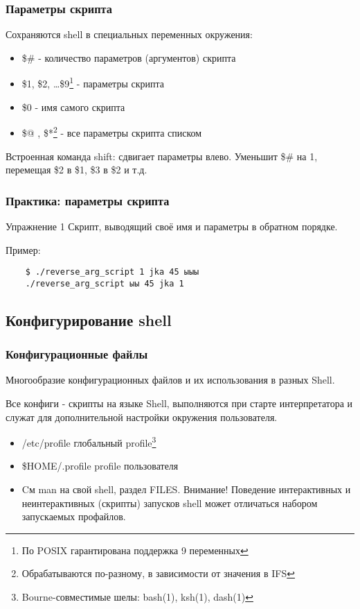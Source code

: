 \begin{frame}[fragile]
  \frametitle{Параметры скрипта}

  Сохраняются shell в специальных переменных окружения:
  \begin{itemize}
    \item \alert{\$\#} - количество параметров (аргументов) скрипта
    \item \alert{\$1, \$2, \ldots \$9}\footnote{По POSIX гарантирована поддержка 9 переменных} - параметры скрипта
      
\pause
    \item \alert{\$0} - имя самого скрипта
    \item \alert{\$@ , \$*}\footnote{Обрабатываются по-разному, в зависимости от значения в IFS} - все параметры скрипта списком 
  \end{itemize} \pause
  Встроенная команда \alert{shift}: сдвигает параметры влево. 
  Уменьшит \alert{\$\#} на 1, перемещая \alert{\$2} в \alert{\$1}, \alert{\$3} в \alert{\$2} и т.д.


\end{frame}

\begin{frame}[fragile]
  \frametitle{Практика: параметры скрипта}

  \alert{Упражнение 1} Скрипт, выводящий своё имя и параметры в обратном порядке.

  Пример:
  \begin{verbatim}
    $ ./reverse_arg_script 1 jka 45 ыыы
    ./reverse_arg_script ыы 45 jka 1
  \end{verbatim}

\end{frame}

\subsection{Конфигурирование shell}
\begin{frame}
  \frametitle{Конфигурационные файлы}
  Многообразие конфигурационных файлов и их использования в разных Shell.

  Все конфиги - скрипты на языке Shell, выполняются при старте интерпретатора и служат для дополнительной настройки окружения пользователя. 

  \begin{itemize}
    \item \alert{/etc/profile} глобальный profile\footnote{Bourne-совместимые шелы: bash(1), ksh(1), dash(1)}
    \item \alert{\$HOME/.profile} profile пользователя \pause
    \item Cм man на свой shell, раздел FILES. \newline
      \alert{Внимание!} Поведение интерактивных и неинтерактивных (скрипты) запусков shell может отличаться набором запускаемых профайлов. 
  \end{itemize}

\end{frame}

